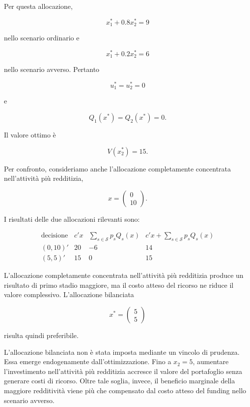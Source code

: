 Per questa allocazione,

\[
x_1^*+0.8x_2^*
=
9
\]

\noindent nello scenario ordinario e

\[
x_1^*+0.2x_2^*
=
6
\]

\noindent nello scenario avverso. Pertanto

\[
u_1^*=u_2^*=0
\]

\noindent e

\[
Q_1(x^*)=Q_2(x^*)=0.
\]

Il valore ottimo \`e

\[
V(x_2^*)=15.
\]

Per confronto, consideriamo anche l'allocazione completamente concentrata
nell'attivit\`a pi\`u redditizia,

\[
x=
\begin{pmatrix}
0\\
10
\end{pmatrix}.
\]

I risultati delle due allocazioni rilevanti sono:

\[
\begin{array}{c|c|c|c}
\text{decisione}
&
c'x
&
\sum_{s\in\mathcal S}p_sQ_s(x)
&
c'x+\sum_{s\in\mathcal S}p_sQ_s(x)
\\
\hline
(0,10)'
&
20
&
-6
&
14
\\
(5,5)'
&
15
&
0
&
15
\end{array}
\]

L'allocazione completamente concentrata nell'attivit\`a pi\`u redditizia
produce un risultato di primo stadio maggiore, ma il costo atteso del ricorso ne riduce il valore complessivo. L'allocazione bilanciata

\[
x^*=
\begin{pmatrix}
5\\
5
\end{pmatrix}
\]

\noindent risulta quindi preferibile.

\begin{remark}
L'allocazione bilanciata non \`e stata imposta mediante un vincolo di
prudenza. Essa emerge endogenamente dall'ottimizzazione. Fino a
$x_2=5$, aumentare l'investimento nell'attivit\`a pi\`u redditizia accresce
il valore del portafoglio senza generare costi di ricorso. Oltre tale
soglia, invece, il beneficio marginale della maggiore redditivit\`a viene
pi\`u che compensato dal costo atteso del funding nello scenario avverso.
\end{remark}

